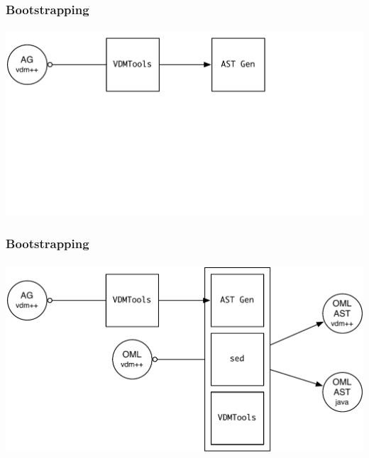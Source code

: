 \documentclass[slidestop,uncompress,mathserif,final]{beamer}
\begin{document}
\begin{frame}[c]
  \frametitle{Bootstrapping}
  \framesubtitle{}


  \begin{center}
    \includegraphics[width=\textwidth]{images/ast_gen_oml_ast_gen.pdf}
  \end{center}

\end{frame}

\begin{frame}[c]
  \frametitle{Bootstrapping}
  \framesubtitle{}


  \begin{center}
    \includegraphics[width=\textwidth]{images/ast_gen_oml_ast_gen_2.pdf}
  \end{center}

\end{frame}
\end{document}
